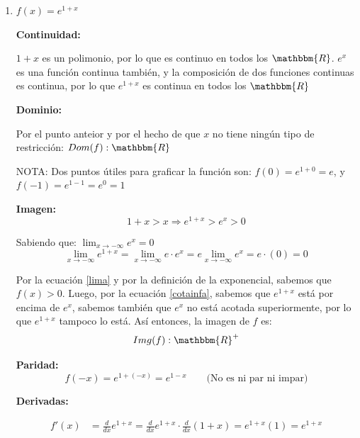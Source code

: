 \documentclass[12pt]{article}
\begin{document}
\begin{enumerate}[\hspace{9px} a)]
    \item \(f(x)=e^{1+x}\)\bigskip
    
        \textbf{Continuidad: }\medskip

            \(1+x\) es un polimonio, por lo que es continuo en todos los \(\mathbbm{R}\). $e^x$ es una funci\'on continua tambi\'en, y la composici\'on de dos funciones continuas es continua, por lo que \(e^{1+x}\) es continua en todos los \(\mathbbm{R}\)

        \textbf{Dominio: }\medskip

            Por el punto anteior y por el hecho de que $x$ no tiene ning\'un tipo de restricci\'on: \(Dom(f): \mathbbm{R}\)\medskip

            NOTA: Dos puntos \'utiles para graficar la funci\'on son: \(f(0)=e^{1+0}=e\), y \(f(-1)=e^{1-1}=e^0=1\)\medskip

        \textbf{Imagen: }
            \begin{equation}
                \label{cotainfa}
                1+x>x \Longrightarrow e^{1+x}>e^x>0
            \end{equation}

            Sabiendo que: \(\lim_{x\to-\infty}e^x=0\)
            \begin{equation}
                \label{lima}
                \lim_{x\to-\infty}e^{1+x}=\lim_{x\to-\infty}e\cdot e^x=e\lim_{x\to-\infty}e^x=e\cdot(0)=0
            \end{equation}

            Por la ecuaci\'on \eqref{lima} y por la definici\'on de la exponencial, sabemos que $f(x)>0$. Luego, por la ecuaci\'on \eqref{cotainfa}, sabemos que \(e^{1+x}\) est\'a por encima de \(e^x\), sabemos tambi\'en que \(e^x\) no est\'a acotada superiormente, por lo que \(e^{1+x}\) tampoco lo est\'a. As\'i entonces, la imagen de $f$ es:
            \[Img(f): \mathbbm{R}^+\]

        \textbf{Paridad: }
            \begin{equation*}
                f(-x) = e^{1+(-x)} = e^{1-x} \qquad \text{(No es ni par ni impar)}
            \end{equation*}

        \textbf{Derivadas: }

            \begin{align*}
                f'(x) &= \frac{d}{dx}e^{1+x} = \frac{d}{dx}e^{1+x}\cdot\frac{d}{dx}(1+x) = e^{1+x}(1) = e^{1+x}
            \end{align*}


\end{enumerate}
\end{document}
